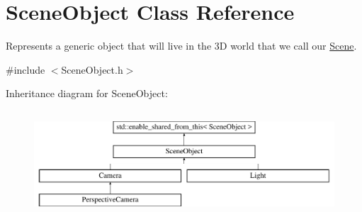 \hypertarget{class_scene_object}{}\section{Scene\+Object Class Reference}
\label{class_scene_object}


Represents a generic object that will live in the 3D world that we call our \hyperlink{class_scene}{Scene}.




{\ttfamily \#include $<$Scene\+Object.\+h$>$}

Inheritance diagram for Scene\+Object\+:\begin{figure}[H]
\begin{center}
\leavevmode
\includegraphics[height=3.985765cm]{class_scene_object}
\end{center}
\end{figure}
